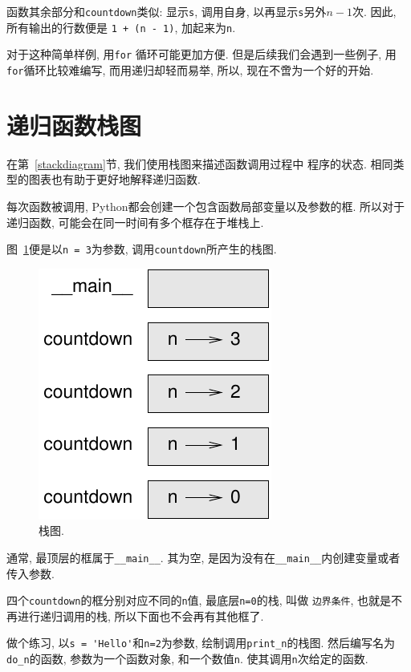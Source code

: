 \documentclass[10pt]{book}
\begin{document}
函数其余部分和{\tt countdown}类似:
显示{\tt s}, 调用自身, 以再显示{\tt s}另外$n-1$次. 
因此, 所有输出的行数便是 {\tt 1 + (n - 1)},  加起来为{\tt n}. 

对于这种简单样例, 用{\tt for} 循环可能更加方便. 
但是后续我们会遇到一些例子, 用{\tt for}循环比较难编写, 而用递归却轻而易举, 
所以, 现在不啻为一个好的开始. 


\section{递归函数栈图}
\label{recursive.stack}

在第~\ref{stackdiagram}节, 我们使用栈图来描述函数调用过程中
程序的状态. 
相同类型的图表也有助于更好地解释递归函数. 

每次函数被调用, Python都会创建一个包含函数局部变量以及参数的框. 
所以对于递归函数, 可能会在同一时间有多个框存在于堆栈上. 

图~\ref{fig.stack2}便是以{\tt n = 3}为参数, 调用{\tt countdown}所产生的栈图. 

\begin{figure}
\centerline
{\includegraphics[scale=0.8]{figs/stack2.pdf}}
\caption{栈图.}
\label{fig.stack2}
\end{figure}

通常, 最顶层的框属于\verb"__main__". 
其为空, 是因为没有在\verb"__main__"内创建变量或者传入参数. 

四个{\tt countdown}的框分别对应不同的{\tt n}值, 最底层{\tt n=0}的栈, 叫做
{\tt 边界条件},  也就是不再进行递归调用的栈, 所以下面也不会再有其他框了. 

做个练习, 以\verb"s = 'Hello'"和{\tt n=2}为参数, 绘制调用\verb"print_n"的栈图. 
然后编写名为\verb"do_n"的函数, 参数为一个函数对象, 和一个数值{\tt n}. 
使其调用{\tt n}次给定的函数. 
\end{document}
